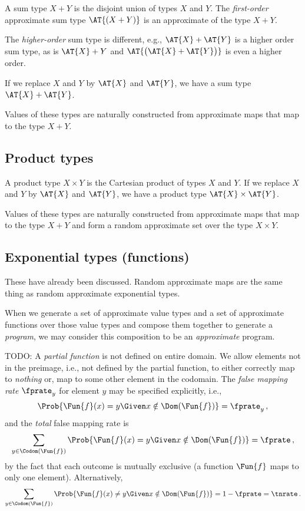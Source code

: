 \documentclass[ ../main.tex]{subfiles}
\begin{document}
A sum type $X + Y$ is the disjoint union of types $X$ and $Y$.
The \emph{first-order} approximate sum type $\AT{\left(X + Y\right)}$ is an approximate of the type $X+Y$.

The \emph{higher-order} sum type is different, e.g., $\AT{X} + \AT{Y}$ is a higher order sum type, as is $\AT{X} + Y$ and $\AT{\left(\AT{X} + \AT{Y}\right)}$ is even a higher order.

If we replace $X$ and $Y$ by $\AT{X}$ and $\AT{Y}$, we have a sum type $\AT{X} + \AT{Y}$.

Values of these types are naturally constructed from approximate maps that map to the type $X+Y$.

\subsection{Product types}

A product type $X \times Y$ is the Cartesian product of types $X$ and $Y$.
If we replace $X$ and $Y$ by $\AT{X}$ and $\AT{Y}$, we have a product type $\AT{X} \times \AT{Y}$.

Values of these types are naturally constructed from approximate maps that map to the type $X+Y$ and form a random approximate set over the type $X \times Y$.

\subsection{Exponential types (functions)}

These have already been discussed.
Random approximate maps are the same thing as random approximate exponential types.
	

When we generate a set of approximate value types and a set of approximate functions over those value types and compose them together to generate a \emph{program}, we may consider this composition to be an \emph{approximate} program.

TODO:
A \emph{partial function} is not defined on entire domain.
We allow elements not in the preimage, i.e., not defined by the partial function, to either correctly map to \emph{nothing} or, map to some other element in the codomain.
The \emph{false mapping rate} $\fprate_{y}$ for element $y$ may be specified explicitly, i.e.,
\begin{equation}
\Prob{\Fun{f}(x) = y \Given x \notin \Dom(\Fun{f})} = \fprate_{y}\,,
\end{equation}
and the \emph{total} false mapping rate is
\begin{equation}
\sum_{y \in \Codom(\Fun{f})} \Prob{\Fun{f}(x) = y \Given x \notin \Dom(\Fun{f})} = \fprate\,,
\end{equation}
by the fact that each outcome is mutually exclusive (a function $\Fun{f}$ maps to only one element).
Alternatively,
\begin{equation}
\sum_{y \in \Codom(\Fun{f})} \Prob{\Fun{f}(x) \neq y \Given x \notin \Dom(\Fun{f})} = 1-\fprate = \tnrate\,.
\end{equation}
\end{document}
